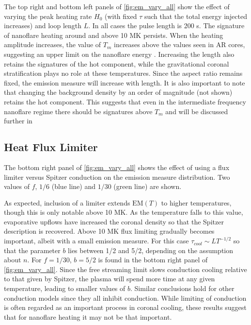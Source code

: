 \documentclass[apj]{emulateapj}
\begin{document}
	\par The top right and bottom left panels of \autoref{fig:em_vary_all} show the effect of varying the peak heating rate $H_0$ (with fixed $\tau$ such that the total energy injected increases) and loop length $L$. In all cases the pulse length is 200 s. The signature of nanoflare heating around and above 10 MK persists. When the heating amplitude increases, the value of $T_m$ increases above the values seen in AR cores, suggesting an upper limit on the nanoflare energy \citep[and hence on the time between nanoflares; see][]{cargill_active_2014}. Increasing the length also retains the signatures of the hot component, while the gravitational coronal stratification plays no role at these temperatures. Since the aspect ratio remains fixed, the emission measure will increase with length. It is also important to note that changing the background density by an order of magnitude (not shown) retains the hot component. This suggests that even in the intermediate frequency nanoflare regime there should be signatures above $T_m$ and will be discussed further in 
	\subsection{Heat Flux Limiter}
	\label{subsec:hf_res}
	The bottom right panel of \autoref{fig:em_vary_all} shows the effect of using a flux limiter versus Spitzer conduction on the emission measure distribution. Two values of $f$, $1/6$ (blue line) and $1/30$ (green line)  are shown.
	\par As expected, inclusion of a limiter extends $\mathrm{EM}(T)$ to higher temperatures, though this is only notable above 10 MK. As the temperature falls to this value, evaporative upflows have increased the coronal density so that the Spitzer description is recovered. Above 10 MK flux limiting gradually becomes important, albeit with a small emission measure. For this case $\tau_{cool} \sim LT^{-1/2}$ so that the parameter $b$ lies between 1/2 and 5/2, depending on the assumption about $n$. For $f = 1/30$, $b = 5/2$ is found in the bottom right panel of \autoref{fig:em_vary_all}. Since the free streaming limit slows conduction cooling relative to that given by Spitzer, the plasma will spend more time at any given temperature, leading to smaller values of $b$. Similar conclusions hold for other conduction models \citep[e.g. the non-local model discussed in the coronal context by][]{karpen_nonlocal_1987,west_lifetime_2008} since they all inhibit conduction. While limiting of conduction is often regarded as an important process in coronal cooling, these results suggest that for nanoflare heating it may not be that important.
\end{document}
